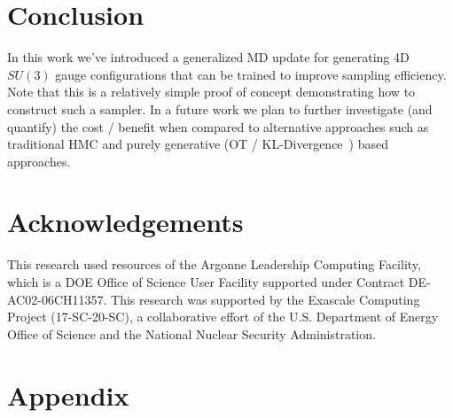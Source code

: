 \documentclass[a4paper,11pt]{article}
\begin{document}
\section{\label{sec:conclusion}Conclusion}
%
In this work we've introduced a generalized MD update for generating 4D $SU(3)$ gauge configurations that can be trained to improve sampling efficiency.
%
Note that this is a relatively simple proof of concept demonstrating how to construct such a sampler.
%
In a future work we plan to further investigate (and quantify) the cost / benefit when compared to alternative approaches such as traditional HMC and purely generative (OT / KL-Divergence~\cite{albergo_flow-based_2019,albergo_introduction_2021,boyda_sampling_2021,kanwar_equivariant_2020}) based approaches.
%
%
\section{\label{sec:acknowledgements}Acknowledgements}
This research used resources of the Argonne Leadership Computing Facility,
which is a DOE Office of Science User Facility supported under Contract DE-AC02-06CH11357.
%
This research was supported by the Exascale Computing Project (17-SC-20-SC), a collaborative effort of the U.S. Department of Energy Office of Science and the National Nuclear Security Administration.
%
%
\nocite{*}
{}



\appendix
%
\section{\label{appendix}Appendix}
%
%
\end{document}
